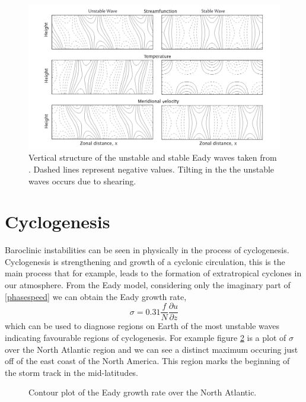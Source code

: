 \documentclass[a4paper,12pt]{article}
\begin{document}
\begin{figure}[htp!]
  \centering
  \includegraphics[width=\textwidth]{growthrates.png}
  \caption{Vertical structure of the unstable and stable Eady waves taken from \cite{Vallis2019}. Dashed lines represent negative values. Tilting in the the unstable waves occurs due to shearing.} 
  \label{growthpicture}
\end{figure}
\section{Cyclogenesis} 
Baroclinic instabilities can be seen in physically in the process of cyclogenesis. Cyclogenesis is strengthening and growth of a cyclonic circulation, this is the main process that for example, leads to the formation of extratropical cyclones in our atmosphere. From the Eady model, considering only the imaginary part of \ref{phasespeed} we can obtain the Eady growth rate, 
\begin{equation}
  \sigma = 0.31\frac{f}{N}\frac{\partial u}{\partial z}
\end{equation}
which can be used to diagnose regions on Earth of the most unstable waves indicating favourable regions of cyclogenesis. For example figure \ref{physicalgrowthrate} is a plot of $\sigma$ over the North Atlantic region and we can see a distinct maximum occuring just off of the east coast of the North America. This region marks the beginning of the storm track in the mid-latitudes.
\begin{figure}[!htp]
  \centering
  \caption{Contour plot of the Eady growth rate over the North Atlantic.}
  \label{physicalgrowthrate}
\end{figure} 
\end{document}
